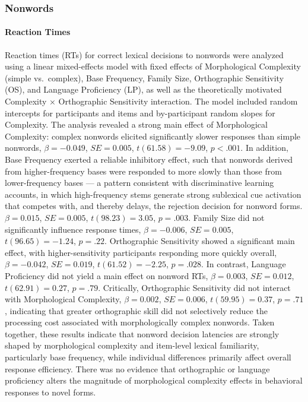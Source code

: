 \subsubsection{Nonwords}

\paragraph*{Reaction Times}
Reaction times (RTs) for correct lexical decisions to nonwords were analyzed using a linear mixed-effects model with fixed effects of Morphological Complexity (simple vs.\ complex), Base Frequency, Family Size, Orthographic Sensitivity (OS), and Language Proficiency (LP), as well as the theoretically motivated Complexity × Orthographic Sensitivity interaction. The model included random intercepts for participants and items and by-participant random slopes for Complexity. The analysis revealed a strong main effect of Morphological Complexity: complex nonwords elicited significantly slower responses than simple nonwords, $\beta = -0.049$, $SE = 0.005$, $t(61.58) = -9.09$, $p < .001$. In addition, Base Frequency exerted a reliable inhibitory effect, such that nonwords derived from higher-frequency bases were responded to more slowly than those from lower-frequency bases — a pattern consistent with discriminative learning accounts, in which high-frequency stems generate strong sublexical cue activation that competes with, and thereby delays, the rejection decision for nonword forms. $\beta = 0.015$, $SE = 0.005$, $t(98.23) = 3.05$, $p = .003$. Family Size did not significantly influence response times, $\beta = -0.006$, $SE = 0.005$, $t(96.65) = -1.24$, $p = .22$. Orthographic Sensitivity showed a significant main effect, with higher-sensitivity participants responding more quickly overall, $\beta = -0.042$, $SE = 0.019$, $t(61.52) = -2.25$, $p = .028$. In contrast, Language Proficiency did not yield a main effect on nonword RTs, $\beta = 0.003$, $SE = 0.012$, $t(62.91) = 0.27$, $p = .79$. Critically, Orthographic Sensitivity did not interact with Morphological Complexity, $\beta = 0.002$, $SE = 0.006$, $t(59.95) = 0.37$, $p = .71$, indicating that greater orthographic skill did not selectively reduce the processing cost associated with morphologically complex nonwords. Taken together, these results indicate that nonword decision latencies are strongly shaped by morphological complexity and item-level lexical familiarity, particularly base frequency, while individual differences primarily affect overall response efficiency. There was no evidence that orthographic or language proficiency alters the magnitude of morphological complexity effects in behavioral responses to novel forms.

